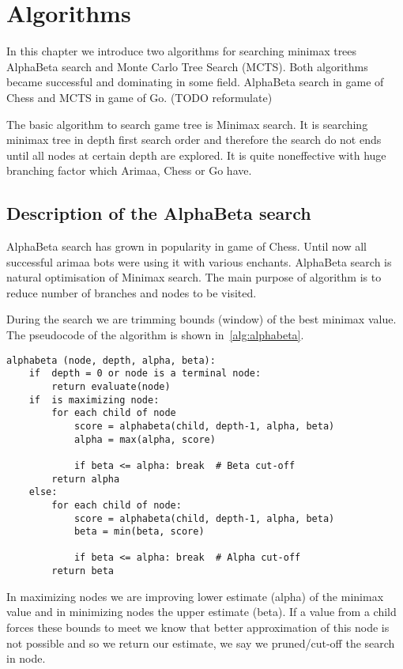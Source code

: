 \chapter{Algorithms}
In this chapter we introduce two algorithms for searching minimax trees
AlphaBeta search and Monte Carlo Tree Search (MCTS). Both algorithms became
successful and dominating in some field. AlphaBeta search in game of Chess and
MCTS in game of Go. (TODO reformulate)

The basic algorithm to search game tree is Minimax search. It is searching
minimax tree in depth first search order and therefore the search do not ends
until all nodes at certain depth are explored. It is quite noneffective with
huge branching factor which Arimaa, Chess or Go have.

\section{Description of the AlphaBeta search}
AlphaBeta search has grown in popularity in game of Chess. Until now all
successful arimaa bots were using it with various enchants. AlphaBeta search is
natural optimisation of Minimax search. The main purpose of algorithm is to
reduce number of branches and nodes to be visited.

During the search we are trimming bounds (window) of the best minimax value.
The pseudocode of the algorithm is shown in~\ref{alg:alphabeta}.

\lstset{language=Python, caption=Pseudocode of the AlphaBeta search, label=alg:alphabeta}
\begin{lstlisting}
alphabeta (node, depth, alpha, beta):
    if  depth = 0 or node is a terminal node:
        return evaluate(node)
    if  is maximizing node:
        for each child of node
            score = alphabeta(child, depth-1, alpha, beta)
            alpha = max(alpha, score)

            if beta <= alpha: break  # Beta cut-off
        return alpha
    else:
        for each child of node:
            score = alphabeta(child, depth-1, alpha, beta)
            beta = min(beta, score)

            if beta <= alpha: break  # Alpha cut-off
        return beta
\end{lstlisting}

In maximizing nodes we are improving lower estimate (alpha) of the minimax
value and in minimizing nodes the upper estimate (beta). If a value from a
child forces these bounds to meet we know that better approximation of this
node is not possible and so we return our estimate, we say we pruned/cut-off
the search in node.

